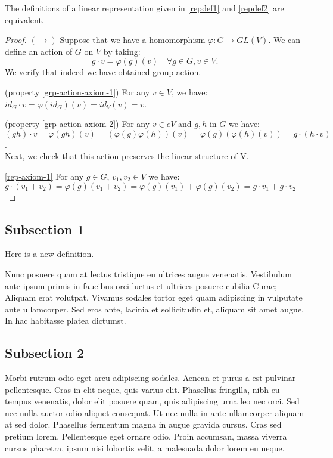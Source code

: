  \begin{prop}
The definitions of a linear representation given in \ref{repdef1} and \ref{repdef2} are equivalent.
 \end{prop}
 \begin{proof}
 $(\rightarrow)$  Suppose that we have a homomorphism $\varphi : G \to GL(V)$.  We can define an action of $G$ on $V$ by taking: \[g \cdot v = \varphi(g)(v) \quad \forall g \in G, v \in V.\]
We verify that indeed we have obtained group action.

(property \ref{grp-action-axiom-1}) \quad For any $v \in V$, we have: $ id_G \cdot v = \varphi(id_G) (v)= id_V (v) = v$. 

(property \ref{grp-action-axiom-2}) \quad For any $v \in eV$ and $g,h$ in $G$ we have: $(gh) \cdot v = \varphi(gh) (v) = (\varphi(g) \varphi(h)) (v)= \varphi(g) (\varphi(h) (v))= g \cdot (h \cdot v)$.\\
Next, we check that this action preserves the linear structure of V.

\ref{rep-axiom-1} For any $g \in G$, $v_1, v_2 \in V$ we have: $g \cdot (v_1 +  v_2) = \varphi(g) (v_1 + v_2) = \varphi(g)(v_1) + \varphi(g)(v_2)= g \cdot v_1 + g \cdot v_2$


 \end{proof}

\subsection{Subsection 1}

\begin{defn}Here is a new definition.\end{defn}

Nunc posuere quam at lectus tristique eu ultrices augue venenatis. Vestibulum ante ipsum primis in faucibus orci luctus et ultrices posuere cubilia Curae; Aliquam erat volutpat. Vivamus sodales tortor eget quam adipiscing in vulputate ante ullamcorper. Sed eros ante, lacinia et sollicitudin et, aliquam sit amet augue. In hac habitasse platea dictumst.


\subsection{Subsection 2}
Morbi rutrum odio eget arcu adipiscing sodales. Aenean et purus a est pulvinar pellentesque. Cras in elit neque, quis varius elit. Phasellus fringilla, nibh eu tempus venenatis, dolor elit posuere quam, quis adipiscing urna leo nec orci. Sed nec nulla auctor odio aliquet consequat. Ut nec nulla in ante ullamcorper aliquam at sed dolor. Phasellus fermentum magna in augue gravida cursus. Cras sed pretium lorem. Pellentesque eget ornare odio. Proin accumsan, massa viverra cursus pharetra, ipsum nisi lobortis velit, a malesuada dolor lorem eu neque.


